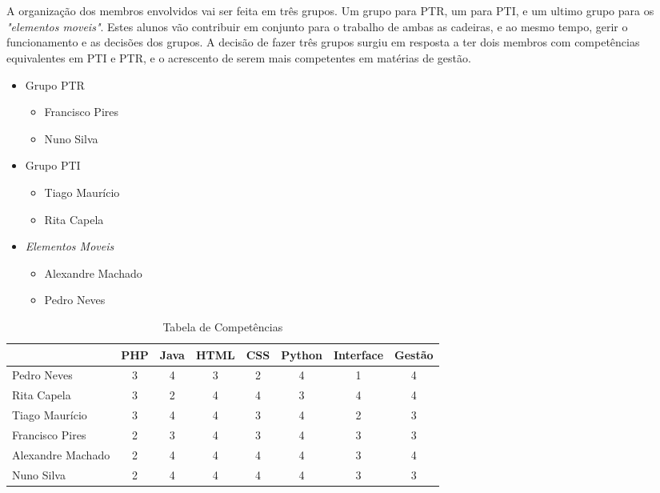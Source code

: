 \documentclass[12pt, a4paper, twoside]{report} %
\begin{document}
\\
\\
A organização dos membros envolvidos vai ser feita em três grupos.
Um grupo para PTR, um para PTI, e um ultimo grupo para os \textit {"elementos moveis"}. 
Estes alunos vão contribuir em conjunto para o trabalho de ambas as cadeiras, e ao mesmo tempo, gerir o funcionamento e as decisões dos grupos.
A decisão de fazer três grupos surgiu em resposta a ter dois membros com competências equivalentes em PTI e PTR, e o acrescento de serem mais competentes em matérias de gestão.

\begin{itemize}
\item Grupo PTR
\begin{itemize}
	\item Francisco Pires
	\item Nuno Silva
\end{itemize}
\item Grupo PTI
\begin{itemize}
	\item Tiago Maurício
	\item Rita Capela
\end{itemize}
\item \textit{Elementos Moveis}
\begin{itemize}
	\item Alexandre Machado
	\item Pedro Neves
\end{itemize}
\end{itemize}


\begin{table}[h]
\centering
\begin{tabular}{|l|c|c|c|c|c|c|c|}
\hline
                  & PHP & Java & HTML & CSS & Python & Interface & Gestão \\ \hline
Pedro Neves       & 3   & 4    & 3    & 2   & 4      & 1         & 4      \\ \hline
Rita Capela       & 3   & 2    & 4    & 4   & 3      & 4         & 4      \\ \hline
Tiago Maurício    & 3   & 4    & 4    & 3   & 4      & 2         & 3      \\ \hline
Francisco Pires   & 2   & 3    & 4    & 3   & 4      & 3         & 3      \\ \hline
Alexandre Machado & 2   & 4    & 4    & 4   & 4      & 3         & 4      \\ \hline
Nuno Silva        & 2   & 4    & 4    & 4   & 4      & 3         & 3      \\ \hline
\end{tabular}
\caption{Tabela de Competências}
\label{competencias}
\end{table}
\end{document}
